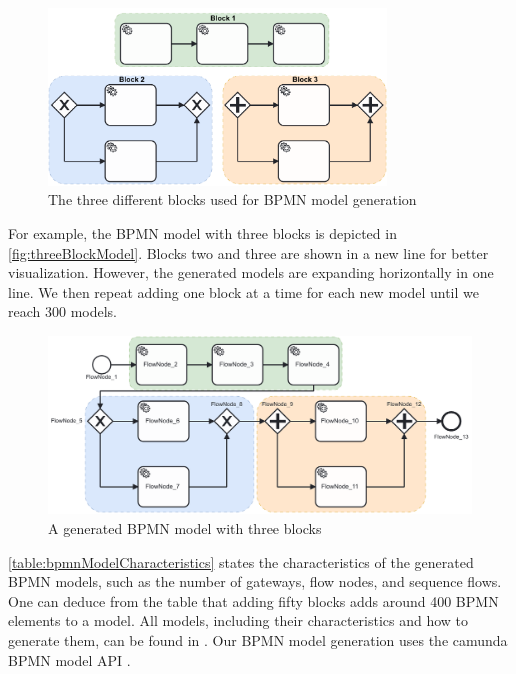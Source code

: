 \documentclass{lmcs} %
\begin{document}
\begin{figure}[ht]
    \centering
    \includegraphics[width=0.8\textwidth]{images/blocks.pdf}
    \caption{The three different blocks used for BPMN model generation}
    \label{fig:blocks}
\end{figure}

For example, the BPMN model with three blocks is depicted in \autoref{fig:threeBlockModel}.
Blocks two and three are shown in a new line for better visualization.
However, the generated models are expanding horizontally in one line.
We then repeat adding one block at a time for each new model until we reach 300 models.

\begin{figure}[ht]
    \centering
    \includegraphics[width=1\textwidth]{images/003.pdf}
    \caption{A generated BPMN model with three blocks}
    \label{fig:threeBlockModel}
\end{figure}

\autoref{table:bpmnModelCharacteristics} states the characteristics of the generated BPMN models, such as the number of gateways, flow nodes, and sequence flows.
One can deduce from the table that adding fifty blocks adds around 400 BPMN elements to a model.
All models, including their characteristics and how to generate them, can be found in \cite{timkrauterLMCS2024Artifacts2023}.
Our BPMN model generation uses the camunda BPMN model API \cite{camundaservicesgmbhCamundaBPMNModel2023}.
\end{document}
